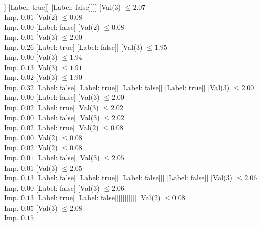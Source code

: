\documentclass[margin=10pt]{standalone}
\begin{document}
\begin{forest}
													]
												[Label: true]]
											[Label: false]]]]
								[Val($3$) $ \leq 2.07$ \\ Imp. $0.01$
									[Val($2$) $ \leq 0.08$ \\ Imp. $0.00$
										[Label: false]
										[Val($2$) $ \leq 0.08$ \\ Imp. $0.01$
											[Val($3$) $ \leq 2.00$ \\ Imp. $0.26$
												[Label: true]
												[Label: false]]
											[Val($3$) $ \leq 1.95$ \\ Imp. $0.00$
												[Val($3$) $ \leq 1.94$ \\ Imp. $0.13$
													[Val($3$) $ \leq 1.91$ \\ Imp. $0.02$
														[Val($3$) $ \leq 1.90$ \\ Imp. $0.32$
															[Label: false]
															[Label: true]]
														[Label: false]]
													[Label: true]]
												[Val($3$) $ \leq 2.00$ \\ Imp. $0.00$
													[Label: false]
													[Val($3$) $ \leq 2.00$ \\ Imp. $0.02$
														[Label: true]
														[Val($3$) $ \leq 2.02$ \\ Imp. $0.00$
															[Label: false]
															[Val($3$) $ \leq 2.02$ \\ Imp. $0.02$
																[Label: true]
																[Val($2$) $ \leq 0.08$ \\ Imp. $0.00$
																	[Val($2$) $ \leq 0.08$ \\ Imp. $0.02$
																		[Val($2$) $ \leq 0.08$ \\ Imp. $0.01$
																			[Label: false]
																			[Val($3$) $ \leq 2.05$ \\ Imp. $0.01$
																				[Val($3$) $ \leq 2.05$ \\ Imp. $0.13$
																					[Label: false]
																					[Label: true]]
																				[Label: false]]]
																		[Label: false]]
																	[Val($3$) $ \leq 2.06$ \\ Imp. $0.00$
																		[Label: false]
																		[Val($3$) $ \leq 2.06$ \\ Imp. $0.13$
																			[Label: true]
																			[Label: false]]]]]]]]]]]
									[Val($2$) $ \leq 0.08$ \\ Imp. $0.05$
										[Val($3$) $ \leq 2.08$ \\ Imp. $0.15$

\end{forest}
\end{document}
